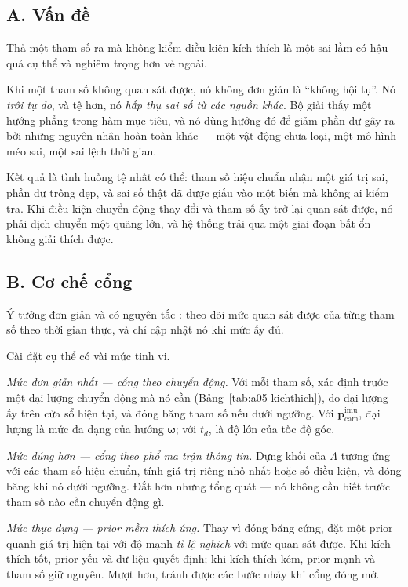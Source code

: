 \documentclass[../../vslam.tex]{subfiles}
\begin{document}
\subsection{A. Vấn đề}

Thả một tham số ra mà không kiểm điều kiện kích thích là một sai lầm có hậu quả cụ thể và nghiêm trọng hơn vẻ ngoài.

Khi một tham số không quan sát được, nó không đơn giản là ``không hội tụ''. Nó \emph{trôi tự do}, và tệ hơn, nó \emph{hấp thụ sai số từ các nguồn khác}. Bộ giải thấy một hướng phẳng trong hàm mục tiêu, và nó dùng hướng đó để giảm phần dư gây ra bởi những nguyên nhân hoàn toàn khác --- một vật động chưa loại, một mô hình méo sai, một sai lệch thời gian.

Kết quả là tình huống tệ nhất có thể: tham số hiệu chuẩn nhận một giá trị sai, phần dư trông đẹp, và sai số thật đã được giấu vào một biến mà không ai kiểm tra. Khi điều kiện chuyển động thay đổi và tham số ấy trở lại quan sát được, nó phải dịch chuyển một quãng lớn, và hệ thống trải qua một giai đoạn bất ổn không giải thích được.

\subsection{B. Cơ chế cổng}

Ý tưởng đơn giản và có nguyên tắc \cite{maye2013selfsupervised,schneider2019observability}: theo dõi mức quan sát được của từng tham số theo thời gian thực, và chỉ cập nhật nó khi mức ấy đủ.

Cài đặt cụ thể có vài mức tinh vi.

\emph{Mức đơn giản nhất --- cổng theo chuyển động.} Với mỗi tham số, xác định trước một đại lượng chuyển động mà nó cần (Bảng~\ref{tab:a05-kichthich}), đo đại lượng ấy trên cửa sổ hiện tại, và đóng băng tham số nếu dưới ngưỡng. Với \(\mathbf{p}_{\text{cam}}^{\text{imu}}\), đại lượng là mức đa dạng của hướng \(\boldsymbol{\omega}\); với \(t_d\), là độ lớn của tốc độ góc.

\emph{Mức đúng hơn --- cổng theo phổ ma trận thông tin.} Dựng khối của \(\Lambda\) tương ứng với các tham số hiệu chuẩn, tính giá trị riêng nhỏ nhất hoặc số điều kiện, và đóng băng khi nó dưới ngưỡng. Đắt hơn nhưng tổng quát --- nó không cần biết trước tham số nào cần chuyển động gì.

\emph{Mức thực dụng --- prior mềm thích ứng.} Thay vì đóng băng cứng, đặt một prior quanh giá trị hiện tại với độ mạnh \emph{tỉ lệ nghịch} với mức quan sát được. Khi kích thích tốt, prior yếu và dữ liệu quyết định; khi kích thích kém, prior mạnh và tham số giữ nguyên. Mượt hơn, tránh được các bước nhảy khi cổng đóng mở.
\end{document}
